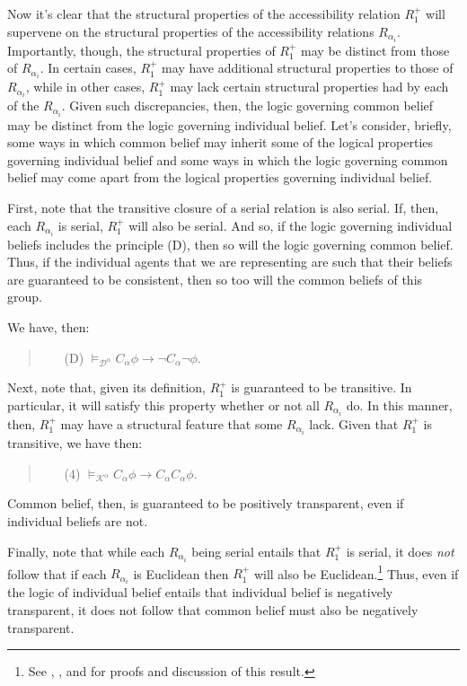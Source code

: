 Now it's clear that the structural properties of the accessibility relation $R^+_{1}$ will supervene on the structural properties of the accessibility relations $R_{\alpha_i}$.
Importantly, though, the structural properties of $R^+_{1}$ may be distinct from those of $R_{\alpha_i}$.
In certain cases, $R^+_{1}$ may have additional structural properties to those of $R_{\alpha_i}$, while in other cases, $R^+_{1}$ may lack certain structural properties had by each of the  $R_{\alpha_i}$.
Given such discrepancies, then, the logic governing common belief may be distinct from the logic governing individual belief.
Let's consider, briefly, some ways in which common belief may inherit some of the logical properties governing individual belief and some ways in which the logic governing common belief may come apart from the logical properties governing individual belief.

First, note that the transitive closure of a serial relation is also serial.
If, then, each $R_{\alpha_i}$ is serial, $R^+_1$ will also be serial.
And so, if the logic governing individual beliefs includes the principle (D), then so will the logic governing common belief.
Thus, if the individual agents that we are representing are such that their beliefs are guaranteed to be consistent, then so too will the common beliefs of this group.

We have, then:
\begin{quote}
\begin{itemize}
\item[(D)] \quad $\models_{\mathcal{D}^\alpha} C_\alpha \phi \rightarrow \lnot C_\alpha \lnot \phi$.
\end{itemize}
\end{quote}
Next, note that, given its definition, $R^+_{1}$ is guaranteed to be transitive. 
In particular, it will satisfy this property whether or not all $R_{\alpha_i}$ do.
In this manner, then, $R^+_{1}$ may have a structural feature that some $R_{\alpha_i}$ lack.
Given that $R^+_{1}$ is transitive, we have then:
\begin{quote}
\begin{itemize}
\item[(4)] \quad $\models_{\mathcal{K}^\alpha} C_\alpha \phi \rightarrow C_\alpha C_\alpha \phi$.
\end{itemize}
\end{quote}
Common belief, then, is guaranteed to be positively transparent, even if individual beliefs are not.

Finally, note that while each $R_{\alpha_i}$ being serial entails that $R^+_1$ is serial, it does \textit{not} follow that if each $R_{\alpha_i}$ is Euclidean then $R^+_1$ will also be Euclidean.\footnote{See \citet{Lismont}, \citet{Colombetti}, and \citet{Bonanno} for proofs and discussion of this result.}
Thus, even if the logic of individual belief entails that individual belief is negatively transparent, it does not follow that common belief must also be negatively transparent.

